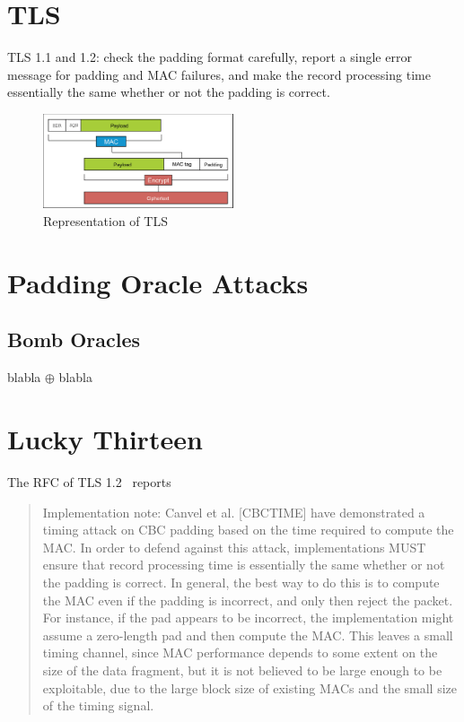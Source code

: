 \documentclass[10pt,conference,a4paper]{IEEEtran}
\begin{document}
\section{TLS}
\label{sec:TLS}
TLS 1.1 and 1.2: check the padding format carefully, report a single error message for padding and MAC failures, and make the record processing time essentially the same whether or not the padding is correct.

\begin{figure}[h]
	\centering
	\includegraphics[width=0.5\textwidth]{tls-representation.jpg}
	\caption{Representation of TLS~\cite{alfardan2013lucky}}
	\label{fig:tls}
\end{figure}

\section{Padding Oracle Attacks}
\label{sec:paddingoracle}

\subsection{}

\subsection{Bomb Oracles}
\label{sec:paddingoracle:bomb}
blabla $\oplus$ blabla


\section{Lucky Thirteen}
\label{sec:lucky}
The RFC of TLS 1.2~\cite{ietf2008transport} reports
\begin{quote}
Implementation note: Canvel et al. [CBCTIME] have demonstrated a timing attack on CBC padding based on the time required to compute the MAC.  In order to defend against this attack, implementations MUST ensure that record processing time is essentially the same whether or not the padding is correct.  In general, the best way to do this is to compute the MAC even if the padding is incorrect, and only then reject the packet.  For instance, if the pad appears to be incorrect, the implementation might assume a zero-length pad and then compute the MAC.  This leaves a small timing channel, since MAC performance depends to some extent on the size of the data fragment, but it is not believed to be large enough to be exploitable, due to the large block size of existing MACs and the small size of the timing signal.
\end{quote}
\end{document}
